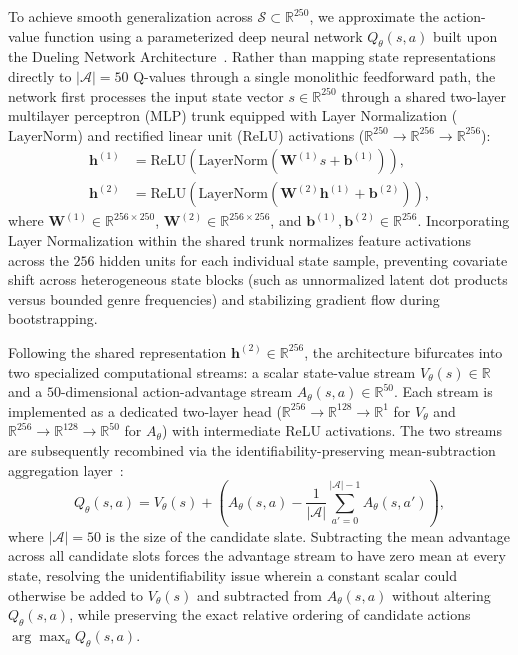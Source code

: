 To achieve smooth generalization across $\mathcal{S} \subset \mathbb{R}^{250}$, we approximate the action-value function using a parameterized deep neural network $Q_\theta(s, a)$ built upon the Dueling Network Architecture~\cite{wang2016dueling}. Rather than mapping state representations directly to $|\mathcal{A}| = 50$ Q-values through a single monolithic feedforward path, the network first processes the input state vector $s \in \mathbb{R}^{250}$ through a shared two-layer multilayer perceptron (MLP) trunk equipped with Layer Normalization ($\text{LayerNorm}$) and rectified linear unit ($\text{ReLU}$) activations ($\mathbb{R}^{250} \to \mathbb{R}^{256} \to \mathbb{R}^{256}$):
\begin{align}
\label{eq:mlp_trunk_1}
\mathbf{h}^{(1)} &= \text{ReLU}\!\left(\text{LayerNorm}\!\left(\mathbf{W}^{(1)} s + \mathbf{b}^{(1)}\right)\right), \\
\label{eq:mlp_trunk_2}
\mathbf{h}^{(2)} &= \text{ReLU}\!\left(\text{LayerNorm}\!\left(\mathbf{W}^{(2)} \mathbf{h}^{(1)} + \mathbf{b}^{(2)}\right)\right),
\end{align}
where $\mathbf{W}^{(1)} \in \mathbb{R}^{256 \times 250}$, $\mathbf{W}^{(2)} \in \mathbb{R}^{256 \times 256}$, and $\mathbf{b}^{(1)}, \mathbf{b}^{(2)} \in \mathbb{R}^{256}$. Incorporating Layer Normalization within the shared trunk normalizes feature activations across the $256$ hidden units for each individual state sample, preventing covariate shift across heterogeneous state blocks (such as unnormalized latent dot products versus bounded genre frequencies) and stabilizing gradient flow during bootstrapping.

Following the shared representation $\mathbf{h}^{(2)} \in \mathbb{R}^{256}$, the architecture bifurcates into two specialized computational streams: a scalar state-value stream $V_\theta(s) \in \mathbb{R}$ and a $50$-dimensional action-advantage stream $A_\theta(s, a) \in \mathbb{R}^{50}$. Each stream is implemented as a dedicated two-layer head ($\mathbb{R}^{256} \to \mathbb{R}^{128} \to \mathbb{R}^{1}$ for $V_\theta$ and $\mathbb{R}^{256} \to \mathbb{R}^{128} \to \mathbb{R}^{50}$ for $A_\theta$) with intermediate ReLU activations. The two streams are subsequently recombined via the identifiability-preserving mean-subtraction aggregation layer~\cite{wang2016dueling}:
\begin{equation}
\label{eq:dueling_aggregation}
Q_\theta(s, a) = V_\theta(s) + \left( A_\theta(s, a) - \frac{1}{|\mathcal{A}|}\sum_{a'=0}^{|\mathcal{A}|-1} A_\theta(s, a') \right),
\end{equation}
where $|\mathcal{A}| = 50$ is the size of the candidate slate. Subtracting the mean advantage across all candidate slots forces the advantage stream to have zero mean at every state, resolving the unidentifiability issue wherein a constant scalar could otherwise be added to $V_\theta(s)$ and subtracted from $A_\theta(s, a)$ without altering $Q_\theta(s, a)$, while preserving the exact relative ordering of candidate actions $\arg\max_{a} Q_\theta(s, a)$.

